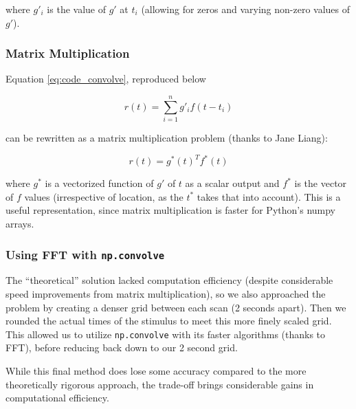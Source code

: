 \documentclass[11pt]{article}
\begin{document}
where $g'_{i}$ is the value of $g'$ at $t_i$ (allowing for zeros and varying 
non-zero values of $g'$).


\subsubsection{Matrix Multiplication}
Equation \ref{eq:code_convolve}, reproduced below

$$r(t)= \sum_{i=1}^n g'_{i} f(t-t_i)$$

can be rewritten as a matrix multiplication problem (thanks to Jane Liang):

\begin{equation} \label{eq:matrix_code_convolve}
r(t)=  g^*(t)^T f^*(t)
\end{equation}

where $g^*$ is a vectorized function of $g'$ of $t$ as a scalar output and 
$f^*$ is the vector of $f$ values (irrespective of location, as the $t^*$ 
takes that into account). This is a useful representation, since matrix 
multiplication is faster for Python's numpy arrays. 


\subsubsection{Using FFT with \texttt{np.convolve}}
The ``theoretical'' solution lacked computation efficiency (despite 
considerable speed improvements from matrix multiplication), so we also 
approached the problem by creating a denser grid between each scan (2 seconds 
apart). Then we rounded the actual times of the stimulus to meet this more 
finely scaled grid. This allowed us to utilize \texttt{np.convolve} with its 
faster algorithms (thanks to FFT), before reducing back down to our 2 second 
grid. 

While this final method does lose some accuracy compared to the more 
theoretically rigorous approach, the trade-off brings considerable gains in 
computational efficiency. 





\end{document}
